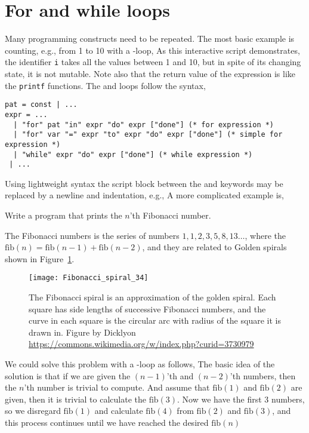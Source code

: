 \section{For and while loops}
Many programming constructs need to be repeated. The most basic example is counting, e.g., from 1 to 10 with a -loop,
%
%
As this interactive script demonstrates, the identifier \lstinline!i! takes all the values between 1 and 10, but in spite of its changing state, it is not mutable. Note also that the return value of the  expression is \lexeme{()} like the \lstinline!printf! functions. The  and  loops follow the syntax,
\begin{lstlisting}[language=ebnf]
pat = const | ...
expr = ... 
  | "for" pat "in" expr "do" expr ["done"] (* for expression *)
  | "for" var "=" expr "to" expr "do" expr ["done"] (* simple for expression *)
  | "while" expr "do" expr ["done"] (* while expression *)
 | ...
\end{lstlisting}
Using lightweight syntax the script block between the  and  keywords may be replaced by a newline and indentation, e.g.,
%
%
A more complicated example is,
\begin{problem}
  Write a program that prints the $n$'th Fibonacci number.
\end{problem}
The Fibonacci numbers is the series of numbers $1,1,2,3,5,8,13\dots$, where the $\text{fib}(n) = \text{fib}(n-1)+\text{fib}(n-2)$, and they are related to Golden spirals shown in Figure~\ref{fig:goldenSpiral}.
\begin{figure}
  \centering
  \texttt{[image: Fibonacci\_spiral\_34]}
  \caption{The Fibonacci spiral is an approximation of the golden spiral. Each square has side lengths of successive Fibonacci numbers, and the curve in each square is the circular arc with radius of the square it is drawn in. Figure by Dicklyon \url{https://commons.wikimedia.org/w/index.php?curid=3730979}}
  \label{fig:goldenSpiral}
\end{figure}
We could solve this problem with a -loop as follows,
%
%
The basic idea of the solution is that if we are given the $(n-1)$'th and $(n-2)$'th numbers, then the $n$'th number is trivial to compute. And assume that $\text{fib}(1)$ and $\text{fib}(2)$ are given, then it is trivial to calculate the $\text{fib}(3)$. Now we have the first 3 numbers, so we disregard $\text{fib}(1)$ and calculate $\text{fib}(4)$ from $\text{fib}(2)$ and $\text{fib}(3)$, and this process continues until we have reached the desired $\text{fib}(n)$

